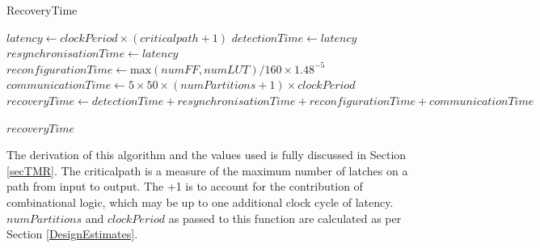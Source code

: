 \documentclass[12pt,final,oneside,a4paper]{dwThesis} %
\begin{document}
\begin{algorithm}
\begin{center}
\begin{tabularx}
         \end{tabularx}

      \end{center}
      \caption{RecoveryTime}\label{recoverytime}

      \begin{algorithmic}[1]
         \State
         $latency \gets clockPeriod\times{}(criticalpath+1)$ 
         \State
         $detectionTime \gets latency$ 
         \State $resynchronisationTime \gets
         latency$ 
         \State $reconfigurationTime \gets \mbox{max}(numFF,
         numLUT)/160\times 1.48^{-5}$ 
         \State $communicationTime \gets 5\times
         50\times(numPartitions+1)\times clockPeriod$ 
         \State $recoveryTime
         \gets
         detectionTime+resynchronisationTime+reconfigurationTime+communicationTime$

         \Return $recoveryTime$ \EndProcedure 
      \end{algorithmic}


   \end{algorithm}
   The derivation of this algorithm and the values used is
   fully discussed in Section \ref{secTMR}. The criticalpath is a measure of
   the maximum number of latches on a path from input to output. The +1 is to
   account for the contribution of combinational logic, which may be up to one
   additional clock cycle of latency. $numPartitions$ and $clockPeriod$ as passed to this function are calculated as per Section \ref{DesignEstimates}.


   \newpage 
\end{document}
